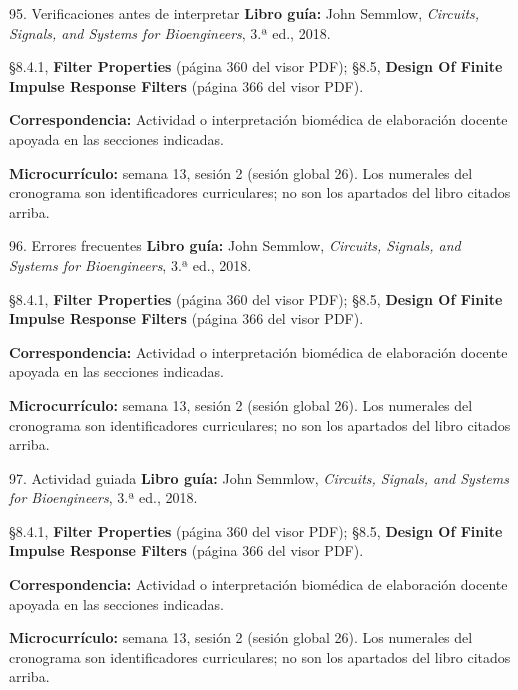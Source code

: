 \documentclass[
  10pt,
  ignorenonframetext,
  aspectratio=169,
  spanish,
]{beamer}
\begin{document}
\begin{frame}{95. Verificaciones antes de interpretar}
\label{verificaciones-antes-de-interpretar-5}
\textbf{Libro guía:} John Semmlow, \emph{Circuits, Signals, and Systems
for Bioengineers}, 3.ª ed., 2018.

§8.4.1, \textbf{Filter Properties} (página 360 del visor PDF); §8.5,
\textbf{Design Of Finite Impulse Response Filters} (página 366 del visor
PDF).

\textbf{Correspondencia:} Actividad o interpretación biomédica de
elaboración docente apoyada en las secciones indicadas.

\textbf{Microcurrículo:} semana 13, sesión 2 (sesión global 26). Los
numerales del cronograma son identificadores curriculares; no son los
apartados del libro citados arriba.
\end{frame}

\begin{frame}{96. Errores frecuentes}
\label{errores-frecuentes-5}
\textbf{Libro guía:} John Semmlow, \emph{Circuits, Signals, and Systems
for Bioengineers}, 3.ª ed., 2018.

§8.4.1, \textbf{Filter Properties} (página 360 del visor PDF); §8.5,
\textbf{Design Of Finite Impulse Response Filters} (página 366 del visor
PDF).

\textbf{Correspondencia:} Actividad o interpretación biomédica de
elaboración docente apoyada en las secciones indicadas.

\textbf{Microcurrículo:} semana 13, sesión 2 (sesión global 26). Los
numerales del cronograma son identificadores curriculares; no son los
apartados del libro citados arriba.
\end{frame}

\begin{frame}{97. Actividad guiada}
\label{actividad-guiada-5}
\textbf{Libro guía:} John Semmlow, \emph{Circuits, Signals, and Systems
for Bioengineers}, 3.ª ed., 2018.

§8.4.1, \textbf{Filter Properties} (página 360 del visor PDF); §8.5,
\textbf{Design Of Finite Impulse Response Filters} (página 366 del visor
PDF).

\textbf{Correspondencia:} Actividad o interpretación biomédica de
elaboración docente apoyada en las secciones indicadas.

\textbf{Microcurrículo:} semana 13, sesión 2 (sesión global 26). Los
numerales del cronograma son identificadores curriculares; no son los
apartados del libro citados arriba.
\end{frame}
\end{document}
